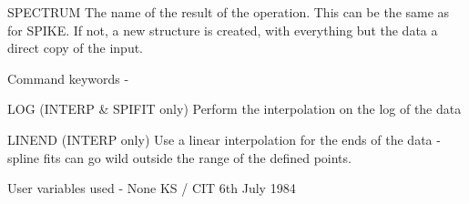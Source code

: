 \begin{description}
\begin{terminalv}
 SPECTRUM   The name of the result of the operation.  This can
            be the same as for SPIKE.  If not, a new structure
            is created, with everything but the data a direct
            copy of the input.

 Command keywords  -

 LOG        (INTERP & SPIFIT only) Perform the interpolation on
            the log of the data

 LINEND     (INTERP only) Use a linear interpolation for the
            ends of the data - spline fits can go wild outside the
            range of the defined points.

 User variables used - None
                                  KS / CIT 6th July 1984
\end{terminalv}
\end{description}
